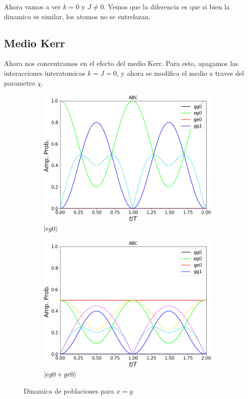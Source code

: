 Ahora vamos a ver $k=0$ y $J\neq 0$. Vemos que la diferencia es que si bien la dinamica es similar, los atomos no se entrelazan.

\subsection{Medio Kerr}

Ahora nos concentramos en el efecto del medio Kerr. Para esto, apagamos las interacciones interatomicas $k=J=0$, y ahora se modifica el medio a traves del parametro $\chi$. 
\begin{figure}[h]
    \centering
    \begin{subfigure}{0.49\textwidth}
        \includegraphics[width=\textwidth]{figuras/ch4/x eg0 abc.png}
        \caption{$\ket{eg0}$}
        \label{fig4:pob x eg0}
    \end{subfigure}
    \hfill
    \begin{subfigure}{0.49\textwidth}
        \includegraphics[width=\textwidth]{figuras/ch4/x eg0+ abc.png}
        \caption{$\ket{eg0+ge0}$}
        \label{fig4:pob x eg0 sim}
    \end{subfigure}
    \caption{Dinamica de poblaciones para $x=g$}
    \label{fig4:pob x}
\end{figure}

